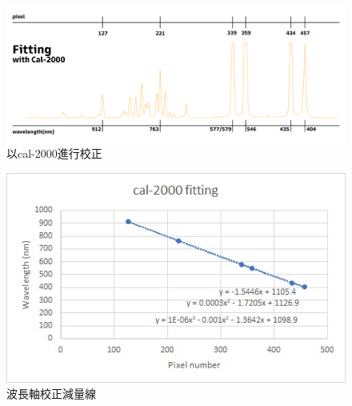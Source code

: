 \documentclass[12pt]{article}
\begin{document}
\begin{figure}[t]
    \centering
    \includegraphics[width=\linewidth]{fitting.jpg}
    \caption{以cal-2000進行校正}
    \label{figure: fitting}
\end{figure}
\begin{figure}[t]
    \centering
    \includegraphics[width=\linewidth]{cal-2000fitting.jpg}
    \caption[]{波長軸校正減量線\protect\footnotemark}
    \label{figure: fit curve}
\end{figure}
\end{document}
